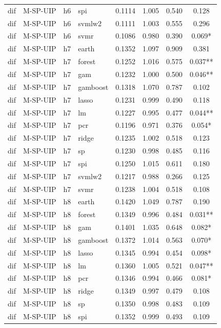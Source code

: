 \begin{ThreePartTable}
\begin{longtable}[t]{llclcccc}
dif & M-SP-UIP & h6 & spi & 0.1114 & 1.005 & 0.540 & 0.128\\
dif & M-SP-UIP & h6 & svmlw2 & 0.1111 & 1.003 & 0.555 & 0.296\\
dif & M-SP-UIP & h6 & svmr & 0.1086 & 0.980 & 0.390 & 0.069*\\
\addlinespace
dif & M-SP-UIP & h7 & earth & 0.1352 & 1.097 & 0.909 & 0.381\\
dif & M-SP-UIP & h7 & forest & 0.1252 & 1.016 & 0.575 & 0.037**\\
dif & M-SP-UIP & h7 & gam & 0.1232 & 1.000 & 0.500 & 0.046**\\
dif & M-SP-UIP & h7 & gamboost & 0.1318 & 1.070 & 0.787 & 0.102\\
dif & M-SP-UIP & h7 & lasso & 0.1231 & 0.999 & 0.490 & 0.118\\
dif & M-SP-UIP & h7 & lm & 0.1227 & 0.995 & 0.477 & 0.044**\\
dif & M-SP-UIP & h7 & pcr & 0.1196 & 0.971 & 0.376 & 0.054*\\
dif & M-SP-UIP & h7 & ridge & 0.1235 & 1.002 & 0.518 & 0.123\\
dif & M-SP-UIP & h7 & sp & 0.1230 & 0.998 & 0.485 & 0.116\\
dif & M-SP-UIP & h7 & spi & 0.1250 & 1.015 & 0.611 & 0.180\\
dif & M-SP-UIP & h7 & svmlw2 & 0.1217 & 0.988 & 0.266 & 0.125\\
dif & M-SP-UIP & h7 & svmr & 0.1238 & 1.004 & 0.518 & 0.108\\
\addlinespace
dif & M-SP-UIP & h8 & earth & 0.1420 & 1.049 & 0.787 & 0.190\\
dif & M-SP-UIP & h8 & forest & 0.1349 & 0.996 & 0.484 & 0.031**\\
dif & M-SP-UIP & h8 & gam & 0.1401 & 1.035 & 0.648 & 0.082*\\
dif & M-SP-UIP & h8 & gamboost & 0.1372 & 1.014 & 0.563 & 0.070*\\
dif & M-SP-UIP & h8 & lasso & 0.1345 & 0.994 & 0.454 & 0.098*\\
dif & M-SP-UIP & h8 & lm & 0.1360 & 1.005 & 0.521 & 0.047**\\
dif & M-SP-UIP & h8 & pcr & 0.1346 & 0.994 & 0.466 & 0.081*\\
dif & M-SP-UIP & h8 & ridge & 0.1349 & 0.997 & 0.479 & 0.108\\
dif & M-SP-UIP & h8 & sp & 0.1350 & 0.998 & 0.483 & 0.109\\
dif & M-SP-UIP & h8 & spi & 0.1352 & 0.999 & 0.493 & 0.109\\

\end{longtable}
\end{ThreePartTable}
